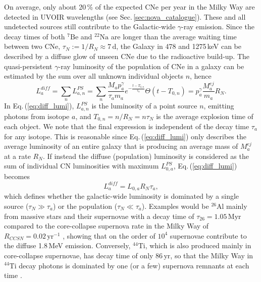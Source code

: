 \documentclass{aa}
\newcommand{\mrm}[1]{\mathrm{#1}}
\newcommand{\nuc}[2]{$\mrm{^{#2}#1}$}
\begin{document}
On average, only about 20\,\% of the expected CNe per year in the Milky Way are detected in UVOIR wavelengths (see Sec.\,\ref{sec:nova_catalogue}).
%
These and all undetected sources still contribute to the Galactic-wide $\gamma$-ray emission.
%
Since the decay times of both \nuc{Be}{7} and \nuc{Na}{22} are longer than the average waiting time between two CNe, $\tau_N := 1/R_N \approx 7\,\mrm{d}$, the Galaxy in 478 and 1275\,keV can be described by a diffuse glow of unseen CNe due to the radioactive build-up.
%
The quasi-persistent $\gamma$-ray luminosity of the population of CNe in a galaxy can be estimated by the sum over all unknown individual objects $n$, hence
%
\begin{equation}
	L_a^{diff} = \sum_{n} L_{a,n}^{PS} = \sum_n \frac{M_a p_a^{\gamma}}{\tau_a m_a} e^{-\frac{t-T_{0,n}}{\tau_a}} \Theta(t-T_{0,n}) = p_a^{\gamma} \frac{M_a^{ej}}{m_a} R_N\mrm{.}
	\label{eq:diff_lumi}
\end{equation}
%
In Eq.\,(\ref{eq:diff_lumi}), $L_{a,n}^{PS}$ is the luminosity of a point source $n$, emitting photons from isotope $a$, and $T_{0,n} = n/R_N = n \tau_N$ is the average explosion time of each object.
%
We note that the final expression is independent of the decay time $\tau_a$ for any isotope.
%
This is reasonable since Eq.\,(\ref{eq:diff_lumi}) only describes the average luminosity of an entire galaxy that is producing an average mass of $M_a^{ej}$ at a rate $R_N$.
%
If instead the diffuse (population) luminosity is considered as the sum of individual CN luminosities with maximum $L_{0,a}^{PS}$, Eq.\,(\ref{eq:diff_lumi}) becomes
%
\begin{equation}
L_a^{diff} = L_{0,a} R_N \tau_a\mrm{,}
\end{equation}
%
which defines whether the galactic-wide luminosity is dominated by a single source ($\tau_N \gg \tau_a$) or the population ($\tau_N \ll \tau_a$).
%
Examples would be \nuc{Al}{26} mainly from massive stars and their supernovae with a decay time of $\tau_{26} = 1.05\,\mrm{Myr}$ compared to the core-collapse supernova rate in the Milky Way of $R_{CCSN} = 0.02\,\mrm{yr^{-1}}$ \citep[e.g.][]{Diehl2006_26Al}, showing that on the order of $10^4$ supernovae contribute to the diffuse 1.8\,MeV emission.
%
Conversely, \nuc{Ti}{44}, which is also produced mainly in core-collapse supernovae, has decay time of only $86\,\mrm{yr}$, so that the Milky Way in \nuc{Ti}{44} decay photons is dominated by one (or a few) supernova remnants at each time \citep{The2006_44Ti}.
\end{document}
